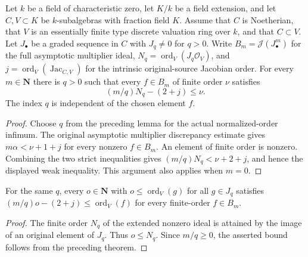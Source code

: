 \begin{theorem}
\label{thm:c0n-actual-finite-index-discrepancy}
\leanok
Let $k$ be a field of characteristic zero, let $K/k$ be a field extension,
and let $C,V\subset K$ be $k$-subalgebras with fraction field $K$.
Assume that $C$ is Noetherian, that $V$ is an essentially finite type
discrete valuation ring over $k$, and that $C\subset V$.
Let $J_\bullet$ be a graded sequence in $C$ with $J_q\ne0$ for $q>0$.
Write $B_m=\mathcal J(J_\bullet^m)$ for the full asymptotic multiplier ideal,
$N_q=\operatorname{ord}_V(J_q\mathcal O_V)$, and
$j=\operatorname{ord}_V(\operatorname{Jac}_{C,V})$ for the intrinsic
original-source Jacobian order.  For every $m\in\mathbf N$ there is $q>0$
such that every $f\in B_m$ of finite order $\nu$ satisfies
\[
 (m/q)N_q-(2+j)\le\nu.
\]
The index $q$ is independent of the chosen element $f$.
\end{theorem}
\begin{proof}
Choose $q$ from the preceding lemma for the actual normalized-order
infimum.  The original asymptotic multiplier discrepancy estimate gives
$m\alpha<\nu+1+j$ for every nonzero $f\in B_m$.  An element of finite
order is nonzero.  Combining the two strict inequalities gives
$(m/q)N_q<\nu+2+j$, and hence the displayed weak inequality.
This argument also applies when $m=0$.
\end{proof}

\begin{corollary}
\label{cor:c0n-actual-lower-orders}
\leanok
For the same $q$, every $o\in\mathbf N$ with
$o\le\operatorname{ord}_V(g)$ for all $g\in J_q$ satisfies
$(m/q)o-(2+j)\le\operatorname{ord}_V(f)$ for every finite-order
$f\in B_m$.
\end{corollary}
\begin{proof}
The finite order $N_q$ of the extended nonzero ideal is attained by the
image of an original element of $J_q$.  Thus $o\le N_q$.
Since $m/q\ge0$, the asserted bound follows from the preceding theorem.
\end{proof}

